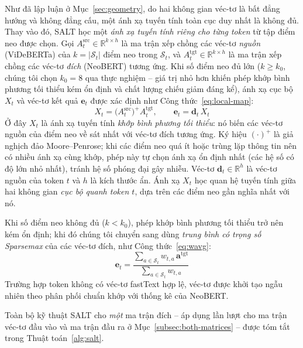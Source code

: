 Như đã lập luận ở Mục~\ref{sec:geometry}, do hai không gian véc-tơ là bất đẳng hướng và không
đẳng cấu, một ánh xạ tuyến tính toàn cục duy nhất là không đủ. Thay vào đó, SALT học một
\textit{ánh xạ tuyến tính riêng cho từng token} từ tập điểm neo được chọn. Gọi $A_t^{\mathrm{src}}
\in \mathbb{R}^{k\times h}$ là ma trận xếp chồng các véc-tơ \textit{nguồn} (ViDeBERTa) của
$k = |\mathcal{S}_t|$ điểm neo trong $\mathcal{S}_t$, và $A_t^{\mathrm{tgt}} \in \mathbb{R}^{k\times
h}$ là ma trận xếp chồng các véc-tơ \textit{đích} (NeoBERT) tương ứng. Khi số điểm neo đủ lớn ($k \ge k_0$, chúng tôi chọn $k_0 = 8$ qua thực nghiệm -- giá trị nhỏ
hơn khiến phép khớp bình phương tối thiểu kém ổn định và chất lượng chiếu giảm đáng kể), ánh xạ cục bộ
$X_t$ và véc-tơ kết quả $\mathbf{e}_t$ được xác định như Công thức~\eqref{eq:local-map}:
\begin{equation}
  \label{eq:local-map}
  X_t = \big(A_t^{\mathrm{src}}\big)^{+} A_t^{\mathrm{tgt}}, \qquad
  \mathbf{e}_t = \mathbf{d}_t\, X_t
\end{equation}
Ở đây $X_t$ là ánh xạ tuyến tính \textit{khớp bình phương tối thiểu}: nó biến các véc-tơ nguồn
của điểm neo về sát nhất với véc-tơ đích tương ứng. Ký hiệu $(\cdot)^{+}$ là giả nghịch đảo
Moore--Penrose; khi các điểm neo quá ít hoặc trùng lặp thông tin nên có nhiều ánh xạ cùng khớp,
phép này tự chọn ánh xạ ổn định nhất (các hệ số có độ lớn nhỏ nhất), tránh hệ số phóng đại gây nhiễu.
Véc-tơ $\mathbf{d}_t \in \mathbb{R}^{h}$
là véc-tơ nguồn của token $t$ và $h$ là kích thước ẩn. Ánh xạ $X_t$ học quan hệ tuyến tính giữa hai không gian \textit{cục bộ
quanh token $t$}, dựa trên các điểm neo gần nghĩa nhất với nó.

Khi số điểm neo không đủ ($k < k_0$), phép khớp bình phương tối thiểu trở nên kém ổn định; khi đó chúng tôi chuyển
sang dùng \textit{trung bình có trọng số Sparsemax} của các véc-tơ đích, như
Công thức~\eqref{eq:wavg}:
\begin{equation}
  \label{eq:wavg}
  \mathbf{e}_t = \frac{\sum_{a\in\mathcal{S}_t} w_{t,a}\, \mathbf{a}^{\mathrm{tgt}}}
                      {\sum_{a\in\mathcal{S}_t} w_{t,a}}
\end{equation}
Trường hợp token không có véc-tơ fastText hợp lệ, véc-tơ được khởi tạo ngẫu nhiên theo phân
phối chuẩn khớp với thống kê của NeoBERT.

Toàn bộ kỹ thuật SALT cho \textit{một} ma trận đích -- áp dụng lần lượt cho ma trận véc-tơ
đầu vào và ma trận đầu ra ở Mục~\ref{subsec:both-matrices} -- được tóm tắt trong
Thuật toán~\ref{alg:salt}.

